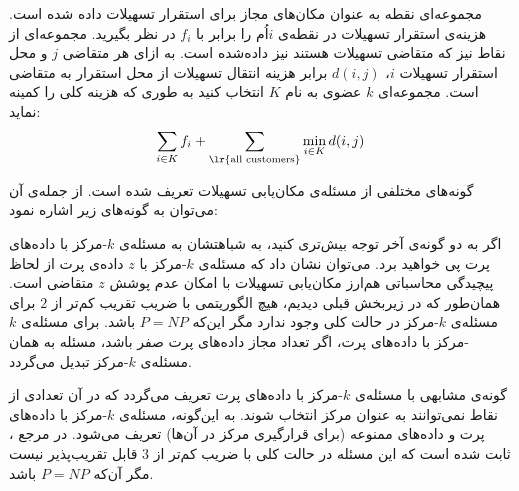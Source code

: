 مجموعه‌ای نقطه به عنوان مکان‌های مجاز برای استقرار تسهیلات داده شده است.
هزینه‌ی استقرار تسهیلات در نقطه‌ی $i$اُم را برابر با $f_i$ در نظر بگیرید.
مجموعه‌ای از نقاط نیز که متقاضی تسهیلات هستند نیز داده‌شده است.
به ازای هر متقاضی $j$ و محل استقرار تسهیلات $i$، $d(i, j)$ برابر هزینه انتقال تسهیلات از محل استقرار به متقاضی است.
مجموعه‌ای $k$ عضوی به نام $K$ انتخاب کنید به طوری که هزینه کلی را کمینه نماید:
$$\sum_{i \in K} f_i + \sum_{\lr{\text{all customers}}}{\min_{i \in K} d(i, j)}$$


 گونه‌های مختلفی از مسئله‌ی مکان‌یابی تسهیلات تعریف شده است.
از جمله‌ی آن می‌توان به گونه‌های زیر اشاره نمود:







اگر به دو گونه‌ی آخر توجه بیش‌تری کنید، به شباهتشان به مسئله‌ی $k$-مرکز با داده‌های پرت پی خواهید برد.
می‌توان نشان داد که مسئله‌ی $k$-مرکز با $z$ داده‌ی پرت از لحاظ پیچیدگی محاسباتی هم‌ارز مکان‌یابی تسهیلات با امکان عدم پوشش $z$ متقاضی است.
همان‌طور که در زیربخش قبلی دیدیم، هیچ الگوریتمی با ضریب تقریب کم‌تر از $2$ برای مسئله‌ی $k$-مرکز در حالت کلی وجود ندارد مگر این‌که $P = NP$ باشد.
برای مسئله‌ی $k$-مرکز با داده‌های پرت، اگر تعداد مجاز داده‌های پرت صفر باشد، مسئله به همان مسئله‌ی $k$-مرکز تبدیل می‌گردد.

گونه‌ی مشابهی با مسئله‌ی $k$-مرکز با داده‌های پرت تعریف می‌گردد که در آن تعدادی از نقاط نمی‌توانند به عنوان مرکز انتخاب شوند.
به این‌گونه، مسئله‌ی $k$-مرکز با داده‌های پرت و داده‌های ممنوعه (برای قرارگیری مرکز در آن‌ها) تعریف می‌شود.
در مرجع ، ثابت شده است که این مسئله در حالت کلی با ضریب کم‌تر از $3$ قابل تقریب‌پذیر نیست مگر آن‌که $P = NP$ باشد. 

